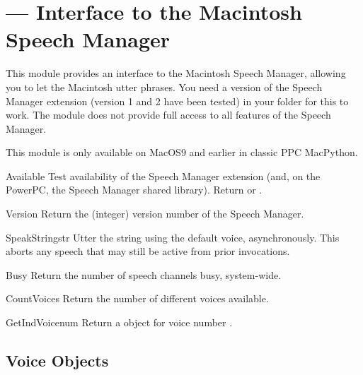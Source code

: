 \section{ ---
         Interface to the Macintosh Speech Manager}



This module provides an interface to the Macintosh Speech Manager,
allowing you to let the Macintosh utter phrases. You need a version of
the Speech Manager extension (version 1 and 2 have been tested) in
your  folder for this to work. The module does not
provide full access to all features of the Speech Manager.

This module is only available on MacOS9 and earlier in classic PPC
MacPython.

\begin{funcdesc}{Available}{}
Test availability of the Speech Manager extension (and, on the
PowerPC, the Speech Manager shared library). Return  or
.
\end{funcdesc}

\begin{funcdesc}{Version}{}
Return the (integer) version number of the Speech Manager.
\end{funcdesc}

\begin{funcdesc}{SpeakString}{str}
Utter the string  using the default voice,
asynchronously. This aborts any speech that may still be active from
prior  invocations.
\end{funcdesc}

\begin{funcdesc}{Busy}{}
Return the number of speech channels busy, system-wide.
\end{funcdesc}

\begin{funcdesc}{CountVoices}{}
Return the number of different voices available.
\end{funcdesc}

\begin{funcdesc}{GetIndVoice}{num}
Return a  object for voice number .
\end{funcdesc}

\subsection{Voice Objects}
\label{voice-objects}

